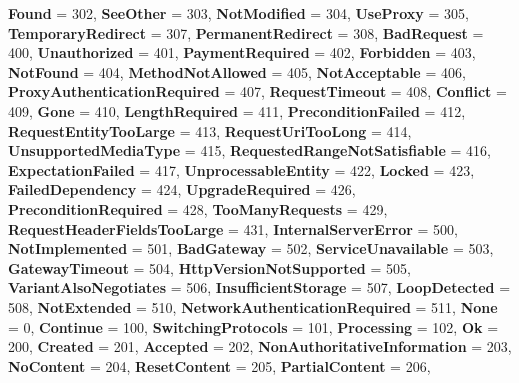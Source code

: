 \begin{DoxyCompactItemize}
{\bfseries Found} = 302, 
{\bfseries See\+Other} = 303, 
{\bfseries Not\+Modified} = 304, 
{\bfseries Use\+Proxy} = 305, 
\newline
{\bfseries Temporary\+Redirect} = 307, 
{\bfseries Permanent\+Redirect} = 308, 
{\bfseries Bad\+Request} = 400, 
{\bfseries Unauthorized} = 401, 
\newline
{\bfseries Payment\+Required} = 402, 
{\bfseries Forbidden} = 403, 
{\bfseries Not\+Found} = 404, 
{\bfseries Method\+Not\+Allowed} = 405, 
\newline
{\bfseries Not\+Acceptable} = 406, 
{\bfseries Proxy\+Authentication\+Required} = 407, 
{\bfseries Request\+Timeout} = 408, 
{\bfseries Conflict} = 409, 
\newline
{\bfseries Gone} = 410, 
{\bfseries Length\+Required} = 411, 
{\bfseries Precondition\+Failed} = 412, 
{\bfseries Request\+Entity\+Too\+Large} = 413, 
\newline
{\bfseries Request\+Uri\+Too\+Long} = 414, 
{\bfseries Unsupported\+Media\+Type} = 415, 
{\bfseries Requested\+Range\+Not\+Satisfiable} = 416, 
{\bfseries Expectation\+Failed} = 417, 
\newline
{\bfseries Unprocessable\+Entity} = 422, 
{\bfseries Locked} = 423, 
{\bfseries Failed\+Dependency} = 424, 
{\bfseries Upgrade\+Required} = 426, 
\newline
{\bfseries Precondition\+Required} = 428, 
{\bfseries Too\+Many\+Requests} = 429, 
{\bfseries Request\+Header\+Fields\+Too\+Large} = 431, 
{\bfseries Internal\+Server\+Error} = 500, 
\newline
{\bfseries Not\+Implemented} = 501, 
{\bfseries Bad\+Gateway} = 502, 
{\bfseries Service\+Unavailable} = 503, 
{\bfseries Gateway\+Timeout} = 504, 
\newline
{\bfseries Http\+Version\+Not\+Supported} = 505, 
{\bfseries Variant\+Also\+Negotiates} = 506, 
{\bfseries Insufficient\+Storage} = 507, 
{\bfseries Loop\+Detected} = 508, 
\newline
{\bfseries Not\+Extended} = 510, 
{\bfseries Network\+Authentication\+Required} = 511, 
{\bfseries None} = 0, 
{\bfseries Continue} = 100, 
\newline
{\bfseries Switching\+Protocols} = 101, 
{\bfseries Processing} = 102, 
{\bfseries Ok} = 200, 
{\bfseries Created} = 201, 
\newline
{\bfseries Accepted} = 202, 
{\bfseries Non\+Authoritative\+Information} = 203, 
{\bfseries No\+Content} = 204, 
{\bfseries Reset\+Content} = 205, 
\newline
{\bfseries Partial\+Content} = 206, 

\end{DoxyCompactItemize}
